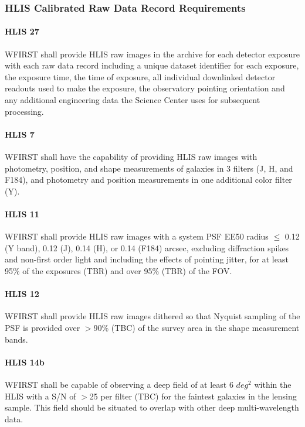 \subsubsection{HLIS Calibrated Raw Data Record Requirements}

\paragraph{HLIS 27} WFIRST shall provide HLIS raw images in the archive for each
detector exposure with each raw data record including a unique dataset
identifier for each exposure, the exposure time, the time of exposure, all
individual downlinked detector readouts used to make the exposure, the
observatory pointing orientation and any additional engineering data the Science
Center uses for subsequent processing.

\paragraph{HLIS 7} WFIRST shall have the capability of providing HLIS raw images with
photometry, position, and shape measurements of galaxies in 3 filters (J, H, and
F184), and photometry and position measurements in one additional color filter
(Y).

\paragraph{HLIS 11} WFIRST shall provide HLIS raw images with a system PSF EE50
radius $\leq$ 0.12 (Y band), 0.12 (J), 0.14 (H), or 0.14 (F184) arcsec, excluding
diffraction spikes and non-first order light and including the effects of
pointing jitter, for at least 95\% of the exposures (TBR) and over 95\% (TBR) of
the FOV.

\paragraph{HLIS 12} WFIRST shall provide HLIS raw images dithered so that
Nyquist sampling of the PSF is provided over $>$90\% (TBC) of the survey area in
the shape measurement bands.

\paragraph{HLIS 14b} WFIRST shall be capable of observing a deep field of at least 6 $deg^2$
within the HLIS with a S/N of $>$25 per filter (TBC) for the faintest galaxies in
the lensing sample. This field should be situated to overlap with other deep
multi-wavelength data.

